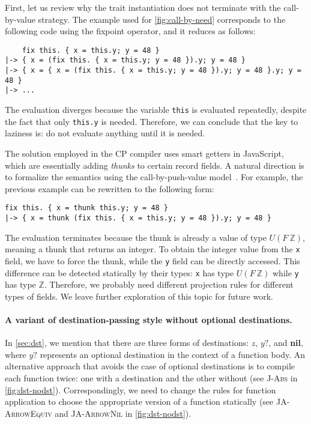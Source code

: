 First, let us review why the trait instantiation does not terminate with the
call-by-value strategy. The example used for \autoref{fig:call-by-need}
corresponds to the following code using the fixpoint operator, and it reduces as
follows:
\begin{lstlisting}
    fix this. { x = this.y; y = 48 }
|-> { x = (fix this. { x = this.y; y = 48 }).y; y = 48 }
|-> { x = { x = (fix this. { x = this.y; y = 48 }).y; y = 48 }.y; y = 48 }
|-> ...
\end{lstlisting}
The evaluation diverges because the variable \lstinline{this} is evaluated
repeatedly, despite the fact that only \lstinline{this.y} is needed. Therefore,
we can conclude that the key to laziness is: do not evaluate anything until it
is needed.

The solution employed in the CP compiler uses smart getters in JavaScript, which
are essentially adding \emph{thunks} to certain record fields. A natural
direction is to formalize the semantics using the call-by-push-value
model~\citep{levy2012call}. For example, the previous example can be rewritten
to the following form:
\begin{lstlisting}[morekeywords=thunk]
    fix this. { x = thunk this.y; y = 48 }
|-> { x = thunk (fix this. { x = this.y; y = 48 }).y; y = 48 }
\end{lstlisting}
The evaluation terminates because the thunk is already a value of type $U (F\
\mathbb{Z})$, meaning a thunk that returns an integer. To obtain the integer
value from the \lstinline{x} field, we have to force the thunk, while the
\lstinline{y} field can be directly accessed. This difference can be detected
statically by their types: \lstinline{x} has type $U (F\ \mathbb{Z})$ while
\lstinline{y} has type $\mathbb{Z}$. Therefore, we probably need different
projection rules for different types of fields. We leave further exploration of
this topic for future work.

\paragraph{A variant of destination-passing style without optional destinations.}
In \autoref{sec:dst}, we mention that there are three forms of destinations:
$z$, $y?$, and \textbf{nil}, where $y?$ represents an optional destination in
the context of a function body. An alternative approach that avoids the case of
optional destinations is to compile each function twice: one with a destination
and the other without (see \textsc{J-Abs} in \autoref{fig:dst-nodst}).
Correspondingly, we need to change the rules for function application to choose
the appropriate version of a function statically (see \textsc{JA-ArrowEquiv} and
\textsc{JA-ArrowNil} in \autoref{fig:dst-nodst}).

